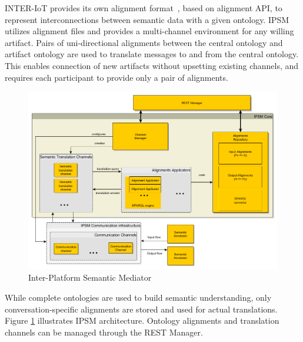 \documentclass{sig-alternate-05-2015}
\begin{document}
INTER-IoT provides its own alignment format~\cite{Pawlowski2017}, based on alignment API, to represent interconnections between semantic data with a given ontology. IPSM utilizes alignment files and provides a multi-channel environment for any willing artifact. Pairs of uni-directional alignments between the central ontology and artifact ontology are used to translate messages to and from the central ontology. This enables connection of new artifacts without upsetting existing channels, and requires each participant to provide only a pair of alignments.

\begin{figure}[h!]
\centering
\includegraphics[scale=0.22]{IPSM}
\caption{Inter-Platform Semantic Mediator}
\label{fig:IPSM}
\end{figure}

While complete ontologies are used to build semantic understanding, only conversation-specific alignments are stored and used for actual translations. Figure \ref{fig:IPSM} illustrates IPSM architecture. Ontology alignments and translation channels can be managed through the REST Manager.
\end{document}
